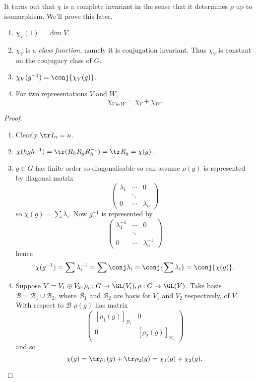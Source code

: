 \documentclass[a4paper]{article}
\begin{document}
It turns out that \(\chi\) is a complete invariant in the sense that it determines \(\rho\) up to isomorphism. We'll prove this later.

\begin{theorem}\leavevmode
  \begin{enumerate}
  \item \(\chi_V(1) = \dim V\).
  \item \(\chi_V\) is a \emph{class function}, namely it is conjugation invariant. Thus \(\chi_V\) is constant on the conjugacy class of \(G\).
  \item \(\chi_V(g^{-1}) = \conj{\chi_V(g)}\).
  \item For two representations \(V\) and \(W\),
    \[
      \chi_{V \oplus W} = \chi_V + \chi_W.
    \]
  \end{enumerate}
\end{theorem}

\begin{proof}\leavevmode
  \begin{enumerate}
  \item Clearly \(\tr I_n = n\).
  \item \(\chi(hgh^{-1}) = \tr(R_hR_gR_h^{-1}) = \tr R_g = \chi(g)\).
  \item \(g \in G\) has finite order so diagonalisable so can assume \(\rho(g)\) is represented by diagonal matrix
    \[
      \begin{pmatrix}
        \lambda_1 & \cdots & 0 \\
        & \ddots \\
        0 & \cdots & \lambda_n
      \end{pmatrix}
    \]
    so \(\chi(g) = \sum \lambda_i\). Now \(g^{-1}\) is represented by
    \[
      \begin{pmatrix}
        \lambda_1^{-1} & \cdots & 0 \\
        & \ddots \\
        0 & \cdots & \lambda_n^{-1}
      \end{pmatrix}
    \] 
    hence
    \[
      \chi(g^{-1}) = \sum \lambda_i^{-1} = \sum \conj \lambda_i = \conj{\sum \lambda_i} = \conj{\chi(g)}.
    \]
  \item Suppose \(V = V_1 \oplus V_2, \rho_i: G \to \GL(V_i), \rho: G \to \GL(V)\). Take basis \(\mathcal B = \mathcal B_1 \cup \mathcal B_2\), where \(\mathcal B_1\) and \(\mathcal B_2\) are basis for \(V_1\) and \(V_2\) respectively, of \(V\). With respect to \(\mathcal B\) \(\rho(g)\) has matrix
    \[
      \begin{pmatrix}
        [\rho_1(g)]_{\mathcal B_1} & 0 \\
        0 & [\rho_2(g)]_{\mathcal B_2}
      \end{pmatrix}
    \]
    and so
    \[
      \chi(g) = \tr \rho_1(g) + \tr \rho_2(g) = \chi_1(g) + \chi_2(g).
    \]
  \end{enumerate}
\end{proof}
\end{document}
